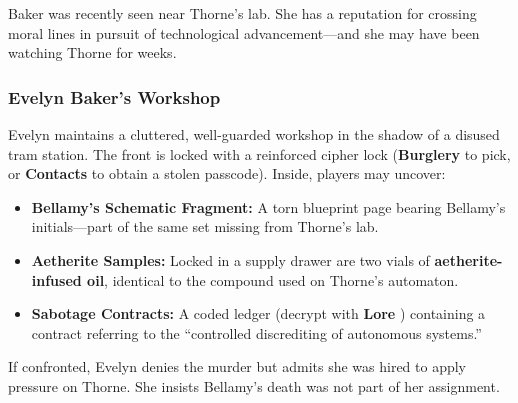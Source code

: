 Baker was recently seen near Thorne’s lab. She has a reputation for crossing moral lines in pursuit of technological advancement—and she may have been watching Thorne for weeks.

\subsubsection*{Evelyn Baker’s Workshop}

Evelyn maintains a cluttered, well-guarded workshop in the shadow of a disused tram station. The front is locked with a reinforced cipher lock (\textbf{Burglery}  to pick, or \textbf{Contacts}  to obtain a stolen passcode). Inside, players may uncover:

\begin{itemize}
  \item \textbf{Bellamy’s Schematic Fragment:} A torn blueprint page bearing Bellamy’s initials—part of the same set missing from Thorne’s lab.
  \item \textbf{Aetherite Samples:} Locked in a supply drawer are two vials of \textbf{aetherite-infused oil}, identical to the compound used on Thorne’s automaton.
  \item \textbf{Sabotage Contracts:} A coded ledger (decrypt with \textbf{Lore} ) containing a contract referring to the “controlled discrediting of autonomous systems.”
\end{itemize}

If confronted, Evelyn denies the murder but admits she was hired to apply pressure on Thorne. She insists Bellamy’s death was not part of her assignment.



